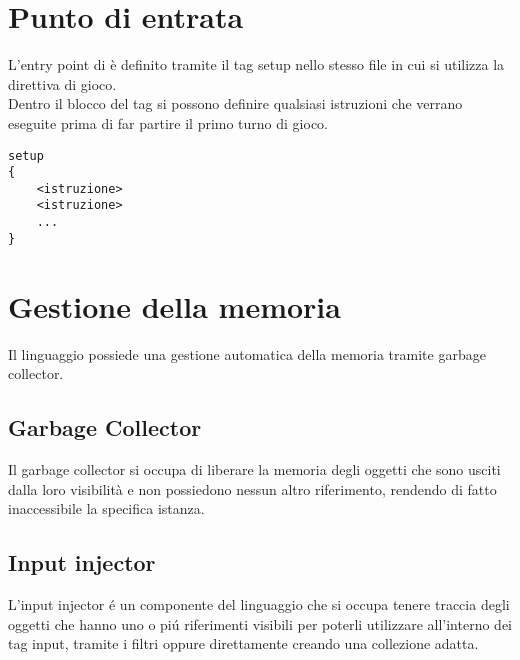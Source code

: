 \section{Punto di entrata}
L'entry point di è definito tramite il tag setup nello stesso file in cui 
si utilizza la direttiva di gioco. \\ 
Dentro il blocco del tag si possono definire qualsiasi istruzioni che verrano eseguite
prima di far partire il primo turno di gioco.
\begin{lstlisting}
setup 
{
    <istruzione>
    <istruzione>
    ...
}
\end{lstlisting}

\section{Gestione della memoria}
Il linguaggio possiede una gestione automatica della memoria tramite garbage collector.

\subsection{Garbage Collector}
Il garbage collector si occupa di liberare la memoria degli oggetti che sono usciti 
dalla loro visibilità e non possiedono nessun altro riferimento, rendendo di fatto 
inaccessibile la specifica istanza. 

\subsection{Input injector}
L'input injector é un componente del linguaggio che si occupa tenere traccia degli
oggetti che hanno uno o piú riferimenti visibili per poterli utilizzare all'interno 
dei tag input, tramite i filtri oppure direttamente creando una collezione adatta. 
